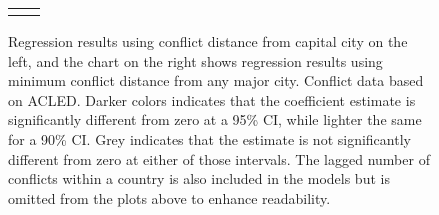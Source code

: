 \begin{figure}
	\centering
	\begin{tabular}{cc}
		\subfloat[SubFigure 1][Capital City]{
			\resizebox{.45\textwidth}{!}{}
		\label{fig:acled}} &
		\subfloat[SubFigure 2][Any Major City]{
			\resizebox{.45\textwidth}{!}{}
		\label{fig:acledfixef}}
	\end{tabular}
	\caption{Regression results using conflict distance from capital city on the left, and the chart on the right shows regression results using minimum conflict distance from any major city. Conflict data based on ACLED. Darker colors indicates that the coefficient estimate is significantly different from zero at a 95\% CI, while lighter the same for a 90\% CI. Grey indicates that the estimate is not significantly different from zero at either of those intervals. The lagged number of conflicts within a country is also included in the models but is omitted from the plots above to enhance readability.}
	\label{fig:coefplot}
\end{figure}
